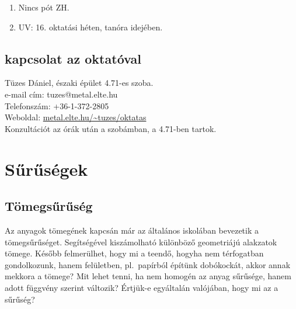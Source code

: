 \documentclass[12pt,a4paper]{scrartcl}
\begin{document}
\begin{enumerate}
\item Nincs pót ZH.
\item UV: 16. oktatási héten, tanóra idejében.
\end{enumerate}

\subsection{kapcsolat az oktatóval}
Tüzes Dániel, északi épület 4.71-es szoba.\\
e-mail cím: tuzes@metal.elte.hu\\
Telefonszám: +36-1-372-2805\\
Weboldal: \href{http://metal.elte.hu/~tuzes/oktatas}{metal.elte.hu/\textasciitilde tuzes/oktatas}\\
Konzultációt az órák után a szobámban, a 4.71-ben tartok.
\newpage

\section{Sűrűségek}
\subsection{Tömegsűrűség}
Az anyagok tömegének kapcsán már az általános iskolában bevezetik a tömegsűrűséget. Segítségével kiszámolható különböző geometriájú alakzatok tömege. Később felmerülhet, hogy mi a teendő, hogyha nem térfogatban gondolkozunk, hanem felületben, pl.\ papírból építünk dobókockát, akkor annak mekkora a tömege? Mit lehet tenni, ha nem homogén az anyag sűrűsége, hanem adott függvény szerint változik? Értjük-e egyáltalán valójában, hogy mi az a sűrűség?
\end{document}
